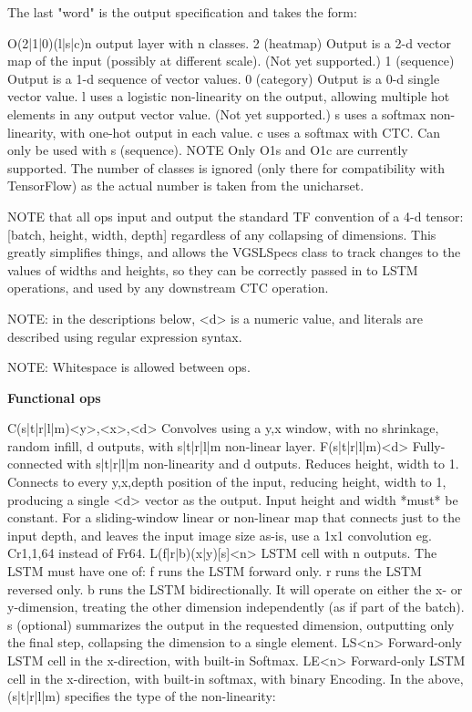 \documentclass{VUMIFInfBakalaurinis}
\begin{document}
The last "word" is the output specification and takes the form:

O(2|1|0)(l|s|c)n output layer with n classes.
  2 (heatmap) Output is a 2-d vector map of the input (possibly at
    different scale). (Not yet supported.)
  1 (sequence) Output is a 1-d sequence of vector values.
  0 (category) Output is a 0-d single vector value.
  l uses a logistic non-linearity on the output, allowing multiple
    hot elements in any output vector value. (Not yet supported.)
  s uses a softmax non-linearity, with one-hot output in each value.
  c uses a softmax with CTC. Can only be used with s (sequence).
  NOTE Only O1s and O1c are currently supported.
The number of classes is ignored (only there for compatibility with TensorFlow) as the actual number is taken from the unicharset.


NOTE that all ops input and output the standard TF convention of a 4-d tensor: [batch, height, width, depth] regardless of any collapsing of dimensions. 
This greatly simplifies things, and allows the VGSLSpecs class to track changes to the values of widths and heights, so they can be correctly passed in 
to LSTM operations, and used by any downstream CTC operation.

NOTE: in the descriptions below, <d> is a numeric value, and literals are described using regular expression syntax.

NOTE: Whitespace is allowed between ops.

\textbf{Functional ops}

C(s|t|r|l|m)<y>,<x>,<d> Convolves using a y,x window, with no shrinkage,
  random infill, d outputs, with s|t|r|l|m non-linear layer.
F(s|t|r|l|m)<d> Fully-connected with s|t|r|l|m non-linearity and d outputs.
  Reduces height, width to 1. Connects to every y,x,depth position of the input,
  reducing height, width to 1, producing a single <d> vector as the output.
  Input height and width *must* be constant.
  For a sliding-window linear or non-linear map that connects just to the
  input depth, and leaves the input image size as-is, use a 1x1 convolution
  eg. Cr1,1,64 instead of Fr64.
L(f|r|b)(x|y)[s]<n> LSTM cell with n outputs.
  The LSTM must have one of:
    f runs the LSTM forward only.
    r runs the LSTM reversed only.
    b runs the LSTM bidirectionally.
  It will operate on either the x- or y-dimension, treating the other dimension
  independently (as if part of the batch).
  s (optional) summarizes the output in the requested dimension, outputting
    only the final step, collapsing the dimension to a single element.
LS<n> Forward-only LSTM cell in the x-direction, with built-in Softmax.
LE<n> Forward-only LSTM cell in the x-direction, with built-in softmax,
  with binary Encoding.
In the above, (s|t|r|l|m) specifies the type of the non-linearity:
\end{document}
